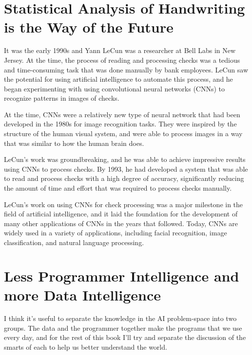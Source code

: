 \section{Statistical Analysis of Handwriting is the Way of the Future}

It was the early 1990s and Yann LeCun was a researcher at Bell Labs in New Jersey. At the time, the process of reading and processing checks was a tedious and time-consuming task that was done manually by bank employees. LeCun saw the potential for using artificial intelligence to automate this process, and he began experimenting with using convolutional neural networks (CNNs) to recognize patterns in images of checks.

At the time, CNNs were a relatively new type of neural network that had been developed in the 1980s for image recognition tasks. They were inspired by the structure of the human visual system, and were able to process images in a way that was similar to how the human brain does.

LeCun's work was groundbreaking, and he was able to achieve impressive results using CNNs to process checks. By 1993, he had developed a system that was able to read and process checks with a high degree of accuracy, significantly reducing the amount of time and effort that was required to process checks manually.

LeCun's work on using CNNs for check processing was a major milestone in the field of artificial intelligence, and it laid the foundation for the development of many other applications of CNNs in the years that followed. Today, CNNs are widely used in a variety of applications, including facial recognition, image classification, and natural language processing. 

\section{Less Programmer Intelligence and more Data Intelligence}

I think it's useful to separate the knowledge in the AI problem-space into two groups. The data and the programmer together make the programs that we use every day, and for the rest of this book I'll try and separate the discussion of the smarts of each to help us better understand the world. 

